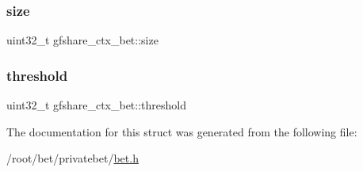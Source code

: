 \mbox{\label{structgfshare__ctx__bet_aadffa692ab06b96d49f1e38024707a03}} 
\subsubsection{\texorpdfstring{size}{size}}
{\footnotesize\ttfamily uint32\+\_\+t gfshare\+\_\+ctx\+\_\+bet\+::size}

\mbox{\label{structgfshare__ctx__bet_ae63c84f60d45927b32f01ee03bc75bb8}} 
\subsubsection{\texorpdfstring{threshold}{threshold}}
{\footnotesize\ttfamily uint32\+\_\+t gfshare\+\_\+ctx\+\_\+bet\+::threshold}



The documentation for this struct was generated from the following file\+:\begin{DoxyCompactItemize}
\item 
/root/bet/privatebet/\hyperlink{bet_8h}{bet.\+h}\end{DoxyCompactItemize}
